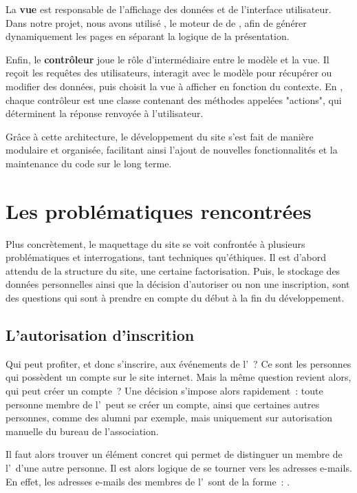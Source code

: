 La \textbf{vue} est responsable de l'affichage des données et de l'interface utilisateur. Dans notre projet, nous avons utilisé , le moteur de  de , afin de générer dynamiquement les pages  en séparant la logique de la présentation.

Enfin, le \textbf{contrôleur} joue le rôle d’intermédiaire entre le modèle et la vue. Il reçoit les requêtes des utilisateurs, interagit avec le modèle pour récupérer ou modifier des données, puis choisit la vue à afficher en fonction du contexte. En , chaque contrôleur est une classe  contenant des méthodes appelées "actions", qui déterminent la réponse renvoyée à l’utilisateur.

Grâce à cette architecture, le développement du site s’est fait de manière modulaire et organisée, facilitant ainsi l’ajout de nouvelles fonctionnalités et la maintenance du code sur le long terme.

\section{Les problématiques rencontrées}
\label{sec:difficultes}

Plus concrètement, le maquettage du site se voit confrontée à plusieurs problématiques et interrogations, tant techniques qu'éthiques. Il est d'abord attendu de la structure du site, une certaine factorisation. Puis, le stockage des données personnelles ainsi que la décision d'autoriser ou non une inscription, sont des questions qui sont à prendre en compte du début à la fin du développement.

\subsection{L'autorisation d'inscrition}
\label{subsec:autorisation-inscription}

Qui peut profiter, et donc s'inscrire, aux événements de l'\ofni~? Ce sont les personnes qui possèdent un compte sur le site internet. Mais la même question revient alors, qui peut créer un compte~? Une décision s'impose alors rapidement~: toute personne membre de l'\univ\ peut se créer un compte, ainsi que certaines autres personnes, comme des alumni par exemple, mais uniquement sur autorisation manuelle du bureau de l'association.

Il faut alors trouver un élément concret qui permet de distinguer un membre de l'\univ\ d'une autre personne. Il est alors logique de se tourner vers les adresses e-mails. En effet, les adresses e-mails des membres de l'\univ\ sont de la forme~: .

